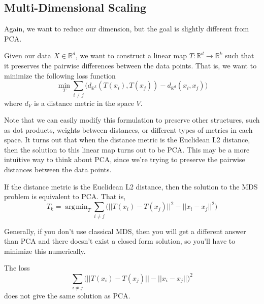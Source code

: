 \documentclass{article}
\DeclareMathOperator*{\argmin}{\arg\!\min}
\begin{document}
  \subsection{Multi-Dimensional Scaling}

    Again, we want to reduce our dimension, but the goal is slightly different from PCA. 

    \begin{definition}
      Given our data $X \in \mathbb{R}^d$, we want to construct a linear map $T: \mathbb{R}^d \rightarrow \mathbb{R}^k$ such that it preserves the pairwise differences between the data points. That is, we want to minimize the following loss function 
      \begin{equation}
        \min_{T} \sum_{i \neq j} \big( d_{\mathbb{R}^k}(T(x_i), T(x_j)) - d_{\mathbb{R}^d}(x_i, x_j) \big)
      \end{equation}
      where $d_{V}$ is a distance metric in the space $V$. 
    \end{definition}

    Note that we can easily modify this formulation to preserve other structures, such as dot products, weights between distances, or different types of metrics in each space. It turns out that when the distance metric is the Euclidean L2 distance, then the solution to this linear map turns out to be PCA. This may be a more intuitive way to think about PCA, since we're trying to preserve the pairwise distances between the data points. 

    \begin{theorem}
      If the distance metric is the Euclidean L2 distance, then the solution to the MDS problem is equivalent to PCA. That is, 
      \begin{equation}
        T_k = \argmin_{T} \sum_{i \neq j} \big( ||T(x_i) - T(x_j)||^2 - ||x_i - x_j||^2 \big)
      \end{equation}
    \end{theorem}

    Generally, if you don't use classical MDS, then you will get a different answer than PCA and there doesn't exist a closed form solution, so you'll have to minimize this numerically. 

    \begin{example}
      The loss 
      \begin{equation}
        \sum_{i \neq j}  \big( ||T(x_i) - T(x_j)|| - ||x_i - x_j|| \big)^2 
      \end{equation}
      does not give the same solution as PCA. 
    \end{example}
\end{document}
